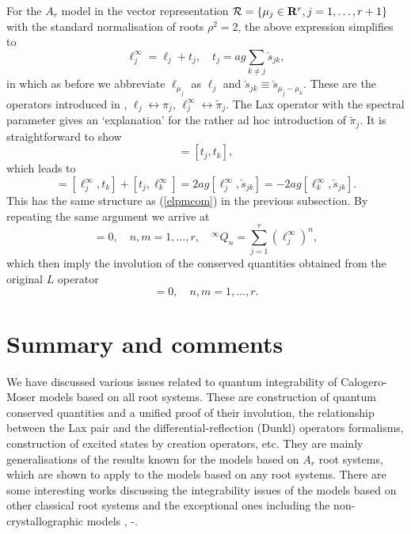 \documentclass[a4paper,12pt]{article}
\begin{document}
For the \(A_r\) model in the vector representation
\({\cal R}=\{\mu_j\in{\bf R}^r,
j=1,\ldots,r+1\}\)
with the standard normalisation of roots \(\rho^2=2\), the above expression
simplifies to
\begin{equation}
   \ell^\infty_j=\ell_j +t_j,\quad
   t_j=ag\sum_{k\neq j}
   \check{s}_{jk},
\end{equation}
in which as before we abbreviate \(\ell_{\mu_j}\) as \(\ell_{j}\)
and \(\check{s}_{jk}\equiv\check{s}_{\mu_j-\mu_k}\).
These are the operators introduced in \cite{Pol},
\(\ell_j\leftrightarrow \pi_j\),
\(\ell_j^\infty\leftrightarrow \tilde\pi_j\).
The Lax operator with the spectral parameter gives an `explanation' for the
rather ad hoc introduction of \(\tilde\pi_j\). It is straightforward to show
\begin{equation}
   [\ell_j,\ell_k]=[t_j,t_k],
\end{equation}
which leads to
\begin{equation}
   [\ell^\infty_j,\ell^\infty_k]=[\ell^\infty_j,t_k]+[t_j,\ell^\infty_k]
   =2ag[\ell^\infty_j,\check{s}_{jk}]
   =-2ag[\ell^\infty_k,\check{s}_{jk}].
\end{equation}
This has the same structure as (\ref{elpmcom}) in the previous subsection.
By repeating the same argument we arrive at \cite{Pol}
\begin{equation}
   [{}^\infty\! Q_n,{}^\infty\! Q_m]=0,\quad n,m=1,\ldots,r,\quad
   {}^\infty\! Q_n=\sum_{j=1}^r(\ell^\infty_j)^n,
\end{equation}
which then imply the involution of the conserved quantities obtained from
the original \(L\) operator
\begin{equation}
   [Q_n,Q_m]=0,\quad n,m=1,\ldots,r.
\end{equation}


\section{Summary and comments}
\label{comdis}
\setcounter{equation}{0}
We have discussed various issues related to quantum integrability of
Calogero-Moser models based on all root systems.
These are construction of quantum conserved quantities and a unified proof
of their involution, the relationship between the Lax pair  and
the differential-reflection (Dunkl) operators formalisms, construction of
excited states by creation operators, etc.
They are mainly generalisations of the results known for the models
based on \(A_r\) root systems, which are shown to apply to the
models based on any root systems.
There are some interesting works discussing the integrability issues
of the models based on other classical root systems and the exceptional
ones including the non-crystallographic models
\cite{G2sep}, \cite{G2new}-\cite{Kha}.
\end{document}
